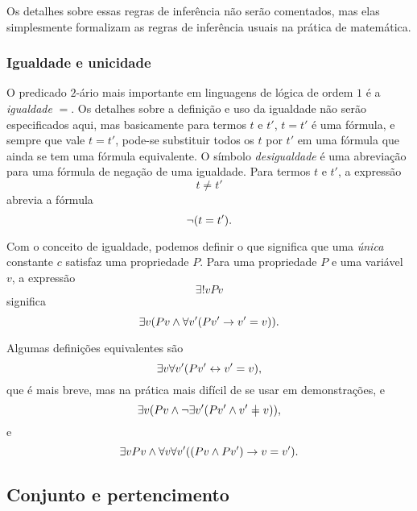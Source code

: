 Os detalhes sobre essas regras de inferência não serão comentados, mas elas simplesmente formalizam as regras de inferência usuais na prática de matemática.

\subsubsection{Igualdade e unicidade}

O predicado $2$-ário mais importante em linguagens de lógica de ordem $1$ é a \emph{igualdade} $=$. Os detalhes sobre a definição e uso da igualdade não serão especificados aqui, mas basicamente para termos $t$ e $t'$, $t=t'$ é uma fórmula, e sempre que vale $t=t'$, pode-se substituir todos os $t$ por $t'$ em uma fórmula que ainda se tem uma fórmula equivalente. O símbolo \emph{desigualdade} é uma abreviação para uma fórmula de negação de uma igualdade. Para termos $t$ e $t'$, a expressão
	\begin{equation*}
	t \neq t'
	\end{equation*}
abrevia a fórmula
	\begin{equation*}
	\lnot(t = t').
	\end{equation*}

Com o conceito de igualdade, podemos definir o que significa que uma \emph{única} constante $c$ satisfaz uma propriedade $P$. Para uma propriedade $P$ e uma variável $v$, a expressão
	\begin{equation*}
	\exists!v Pv
	\end{equation*}
significa
	\begin{equation*}
	\exists v (Pv \land \forall v'(Pv' \rightarrow v' = v)).
	\end{equation*}

Algumas definições equivalentes são
	\begin{equation*}
	\exists v \forall v' (Pv' \leftrightarrow v'=v),
	\end{equation*}
que é mais breve, mas na prática mais difícil de se usar em demonstrações, e
	\begin{equation*}
	\exists v (Pv \lee \lnao\exists v'(Pv' \lee v' \neq v)),
	\end{equation*}
e
	\begin{equation*}
	\exists v Pv \land \forall v \forall v' ((Pv \land Pv') \rightarrow v=v').
	\end{equation*}

\subsection{Conjunto e pertencimento}

